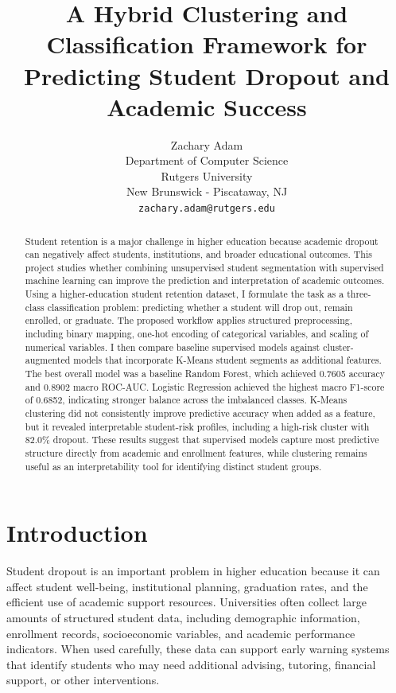 \documentclass{article}
\title{A Hybrid Clustering and Classification Framework for Predicting Student Dropout and Academic Success}
\author{%
  Zachary Adam\\
  Department of Computer Science\\
  Rutgers University\\
  New Brunswick - Piscataway, NJ \\
  \texttt{zachary.adam@rutgers.edu} \\
}
\begin{document}
\maketitle


\begin{abstract}
Student retention is a major challenge in higher education because academic dropout can negatively affect students, institutions, and broader educational outcomes. This project studies whether combining unsupervised student segmentation with supervised machine learning can improve the prediction and interpretation of academic outcomes. Using a higher-education student retention dataset, I formulate the task as a three-class classification problem: predicting whether a student will drop out, remain enrolled, or graduate. The proposed workflow applies structured preprocessing, including binary mapping, one-hot encoding of categorical variables, and scaling of numerical variables. I then compare baseline supervised models against cluster-augmented models that incorporate K-Means student segments as additional features. The best overall model was a baseline Random Forest, which achieved 0.7605 accuracy and 0.8902 macro ROC-AUC. Logistic Regression achieved the highest macro F1-score of 0.6852, indicating stronger balance across the imbalanced classes. K-Means clustering did not consistently improve predictive accuracy when added as a feature, but it revealed interpretable student-risk profiles, including a high-risk cluster with 82.0\% dropout. These results suggest that supervised models capture most predictive structure directly from academic and enrollment features, while clustering remains useful as an interpretability tool for identifying distinct student groups.
\end{abstract}

\section{Introduction}

Student dropout is an important problem in higher education because it can affect student well-being, institutional planning, graduation rates, and the efficient use of academic support resources. Universities often collect large amounts of structured student data, including demographic information, enrollment records, socioeconomic variables, and academic performance indicators. When used carefully, these data can support early warning systems that identify students who may need additional advising, tutoring, financial support, or other interventions.
\end{document}
